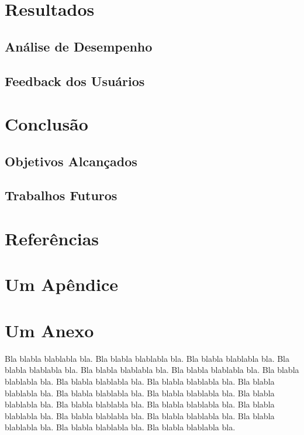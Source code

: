 \documentclass[tcc,capa]{texufpel}
\begin{document}
\chapter{Resultados}
\section{Análise de Desempenho}
\section{Feedback dos Usuários}

\chapter{Conclusão}
\section{Objetivos Alcançados}
\section{Trabalhos Futuros}

\chapter{Referências}




 

\apendices
\chapter{Um Apêndice}

\anexos
\chapter{Um Anexo}

Bla blabla blablabla bla.  Bla blabla blablabla bla.  Bla blabla
blablabla bla.  Bla blabla blablabla bla.  Bla blabla blablabla bla.
Bla blabla blablabla bla.  Bla blabla blablabla bla.  Bla blabla
blablabla bla.  Bla blabla blablabla bla.  Bla blabla blablabla bla.
Bla blabla blablabla bla.  Bla blabla blablabla bla.  Bla blabla
blablabla bla.  Bla blabla blablabla bla.  Bla blabla blablabla bla.
Bla blabla blablabla bla.  Bla blabla blablabla bla.  Bla blabla
blablabla bla.  Bla blabla blablabla bla.  Bla blabla blablabla bla.
Bla blabla blablabla bla.
\end{document}
